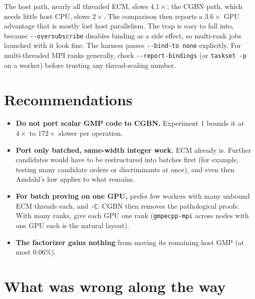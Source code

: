 \documentclass[11pt,a4paper]{article}
\newcommand{\code}[1]{\texttt{#1}}
\begin{document}
The host path, nearly all threaded ECM, slows $4.1\times$; the CGBN path,
which needs little host CPU, slows $2\times$. The comparison then reports a
$3.6\times$ GPU advantage that is mostly lost host parallelism. The trap is
easy to fall into, because \code{-{}-oversubscribe} disables binding as a
side effect, so multi-rank jobs launched with it look fine. The harness
passes \code{-{}-bind-to none} explicitly. For multi-threaded MPI ranks
generally, check \code{-{}-report-bindings} (or \code{taskset -p} on a
worker) before trusting any thread-scaling number.

\section{Recommendations}

\begin{itemize}
  \item \textbf{Do not port scalar GMP code to CGBN.} Experiment 1 bounds it
    at $4\times$ to $172\times$ slower per operation.
  \item \textbf{Port only batched, same-width integer work.} ECM already is.
    Further candidates would have to be restructured into batches first
    (for example, testing many candidate orders or discriminants at once),
    and even then Amdahl's law applies to what remains.
  \item \textbf{For batch proving on one GPU,} prefer few workers with many
    unbound ECM threads each, and \code{-C}: CGBN then removes the
    pathological proofs. With many ranks, give each GPU one rank
    (\code{gmpecpp-mpi} across nodes with one GPU each is the natural
    layout).
  \item \textbf{The factorizer gains nothing} from moving its remaining host
    GMP (at most 0.06\%).
\end{itemize}

\section{What was wrong along the way}
\end{document}

